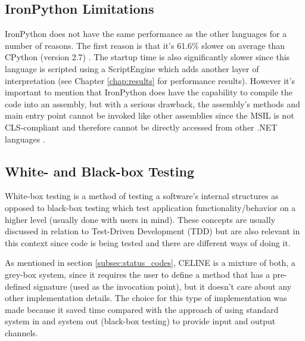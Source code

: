 \subsection{IronPython Limitations} \label{subsec:ironpython_limitations}
IronPython does not have the same performance as the other languages for a number of reasons. The first reason is that it's 61.6\% slower on average than CPython (version 2.7) \cite{IronPythonPerformance}. The startup time is also significantly slower since this language is scripted using a ScriptEngine which adds another layer of interpretation (see Chapter \ref{chap:results} for performance results). However it's important to mention that IronPython does have the capability to compile the code into an assembly, but with a serious drawback, the assembly's methods and main entry point cannot be invoked like other assemblies since the MSIL is not CLS-compliant \cite{CLSCompliant} and therefore cannot be directly accessed from other .NET languages \cite{AccessingPythonCode}. 


\subsection{White- and Black-box Testing} \label{subsec:whitebox_blackbox}
White-box testing is a method of testing a software's internal structures as opposed to black-box testing which test application functionality/behavior on a higher level (usually done with users in mind). These concepts are usually discussed in relation to Test-Driven Development (TDD) but are also relevant in this context since code is being tested and there are different ways of doing it.  

As mentioned in section \ref{subsec:status_codes}, CELINE is a mixture of both, a grey-box system, since it requires the user to define a method that has a pre-defined signature (used as the invocation point), but it doesn't care about any other implementation details. The choice for this type of implementation was made because it saved time compared with the approach of using standard system in and system out (black-box testing) to provide input and output channels. 

